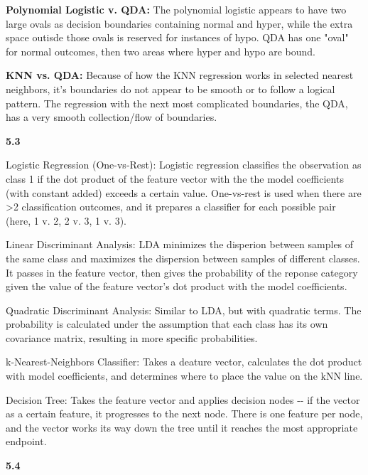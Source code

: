 \documentclass[11pt]{article}
\begin{document}
\textbf{Polynomial Logistic v. QDA:} The polynomial logistic appears to
have two large ovals as decision boundaries containing normal and hyper,
while the extra space outisde those ovals is reserved for instances of
hypo. QDA has one "oval" for normal outcomes, then two areas where hyper
and hypo are bound.

\textbf{KNN vs. QDA:} Because of how the KNN regression works in
selected nearest neighbors, it's boundaries do not appear to be smooth
or to follow a logical pattern. The regression with the next most
complicated boundaries, the QDA, has a very smooth collection/flow of
boundaries.

    \textbf{5.3}

    Logistic Regression (One-vs-Rest): Logistic regression classifies the
observation as class 1 if the dot product of the feature vector with the
the model coefficients (with constant added) exceeds a certain value.
One-vs-rest is used when there are \textgreater{}2 classification
outcomes, and it prepares a classifier for each possible pair (here, 1
v. 2, 2 v. 3, 1 v. 3).

Linear Discriminant Analysis: LDA minimizes the disperion between
samples of the same class and maximizes the dispersion between samples
of different classes. It passes in the feature vector, then gives the
probability of the reponse category given the value of the feature
vector's dot product with the model coefficients.

Quadratic Discriminant Analysis: Similar to LDA, but with quadratic
terms. The probability is calculated under the assumption that each
class has its own covariance matrix, resulting in more specific
probabilities.

k-Nearest-Neighbors Classifier: Takes a deature vector, calculates the
dot product with model coefficients, and determines where to place the
value on the kNN line.

Decision Tree: Takes the feature vector and applies decision nodes -\/-
if the vector as a certain feature, it progresses to the next node.
There is one feature per node, and the vector works its way down the
tree until it reaches the most appropriate endpoint.

    \textbf{5.4}
\end{document}
